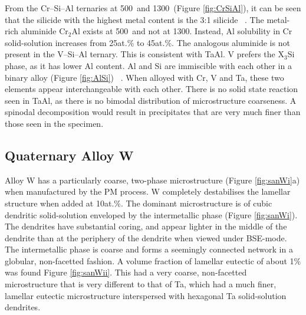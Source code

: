 From the Cr--Si--Al ternaries at 500\celsius\ and 1300\celsius\ (Figure \ref{fig:CrSiAl}), it can be seen that the silicide with the highest metal content is the 3:1 silicide ~\cite{schmid91}.  The metal-rich aluminide Cr$_2$Al exists at 500\celsius\ and not at 1300\celsius.  Instead, Al solubility in Cr solid-solution increases from 25at.\% to 45at.\%.  The analogous aluminide is not present in the V--Si--Al ternary.  This is consistent with TaAl.  V prefers the X$_3$Si phase, as it has lower Al content.  Al and Si are immiscible with each other in a binary alloy (Figure \ref{fig:AlSi}) ~\cite{aoki92}.  When alloyed with Cr, V and Ta, these two elements appear interchangeable with each other.  There is no solid state reaction seen in TaAl, as there is no bimodal distribution of microstructure coarseness.  A spinodal decomposition would result in precipitates that are very much finer than those seen in the specimen.


\subsection{Quaternary Alloy W}

Alloy W has a particularly coarse, two-phase microstructure (Figure \ref{fig:sanWi}a) when manufactured by the PM process.  W completely destabilises the lamellar structure when added at 10at.\%.  The dominant microstructure is of cubic dendritic solid-solution enveloped by the intermetallic phase (Figure \ref{fig:sanWi}).  The dendrites have substantial coring, and appear lighter in the middle of the dendrite than at the periphery of the dendrite when viewed under BSE-mode.  The intermetallic phase is coarse and forms a seemingly connected network in a globular, non-facetted fashion.  A volume fraction of lamellar eutectic of about 1\% was found Figure \ref{fig:sanWii}.  This had a very coarse, non-facetted microstructure that is very different to that of Ta, which had a much finer, lamellar eutectic microstructure interspersed with hexagonal Ta solid-solution dendrites.


